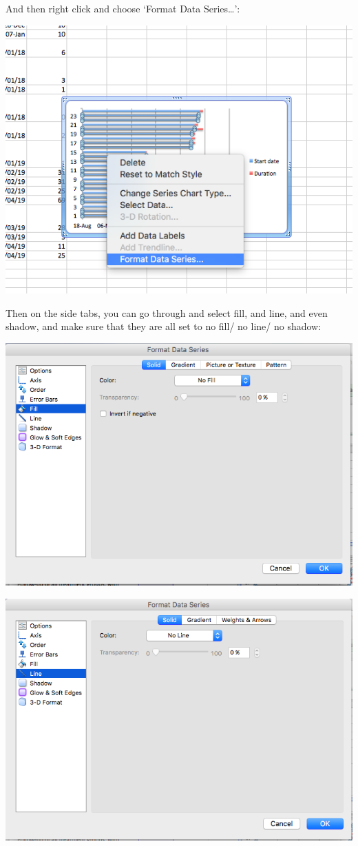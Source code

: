 \documentclass[]{book}
\theoremstyle{definition}
\theoremstyle{definition}
\theoremstyle{definition}
\theoremstyle{remark}
\begin{document}
And then right click and choose `Format Data Series\ldots{}':

\includegraphics{imgs/gantt_format.png}

Then on the side tabs, you can go through and select fill, and line, and
even shadow, and make sure that they are all set to no fill/ no line/ no
shadow:

\includegraphics{imgs/gant_no_fill.png}

\includegraphics{imgs/gantt_no_line.png}
\end{document}
